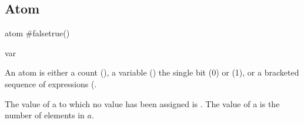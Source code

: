 \documentclass[english]{article}
\newcommand{\cont}{\noindent}
\begin{document}
\subsection{Atom}

\begin{bnfc}
\item[atom]\#\Alt{}\Alt false\Alt true\Alt()
\item[var]
\end{bnfc}

\cont An atom is either a count (), a variable
() the single bit  (0) or  (1), or a
bracketed sequence of expressions (.

The value of a  to which no value has been assigned is
. The value of a   is the number of
elements in $a$.
\end{document}
